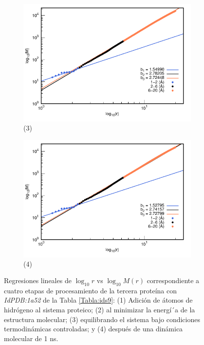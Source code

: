 \begin{figure}[H]
	\vspace{0cm} %
	
	\hspace{-0.3cm} 
	\begin{subfigure}{0.49\textwidth}
		\centering
		\includegraphics[width=\linewidth,page=1]{graphs/PDBs/1a52/1a52Eq.pdf}
		\caption{(3)}
	\end{subfigure}
	\hspace{0.2cm}
	\begin{subfigure}{0.49\textwidth} %
		\centering
		\includegraphics[width=\linewidth,page=1]{graphs/PDBs/1a52/1a521ns.pdf}
		\caption{(4)}
	\end{subfigure}
	\caption{Regresiones lineales de $\log_{10}r$ vs $\log_{10}M(r)$ correspondiente a cuatro etapas de procesamiento de la tercera prote\'{i}na con \textit{IdPDB:1a52} de la Tabla \ref{Tabla:ids9}: (1) Adici\'{o}n de \'{a}tomos de hidr\'{o}geno al sistema proteico; (2) al minimizar la energ\'{i´}a de la estructura molecular; (3) equilibrando el sistema bajo condiciones termodin\'{a}micas controladas; y (4) despu\'{e}s de una din\'{a}mica molecular de 1 ns.}
	\label{fig:1a52}
\end{figure}

